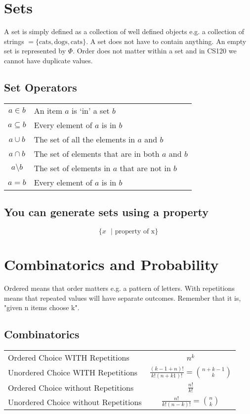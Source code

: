 \documentclass[12pt] {article}
\begin{document}
\section*{Sets}
A set is simply defined as a collection of well defined objects e.g. a collection of strings
$= \{\text{cats}, \text{dogs}, \text{cats}\}$. A set does not have to contain anything. An 
empty set is represented by $\Phi$. Order does not matter within a set and in CS120 we cannot have duplicate values.

\subsection*{Set Operators}
\begin{tabular}{c|l}
  $a \in b $ & An item $a$ is `in' a set $b$ \\
  $a \subseteq b $ & Every element of $a$ is in $b$ \\
  $a \cup b$ & The set of all the elements in $a$ and $b$ \\
  $a \cap b$ & The set of elements that are in both $a$ and $b$ \\
  $a \setminus b$ & The set of elements in $a$ that are not in $b$ \\
  $a = b$ & Every element of $a$ is in $b$ \\
\end{tabular}

\subsection*{You can generate sets using a property}
\begin{equation*}
  \{x \text{ }| \text{ property of x}\}
\end{equation*}

\section*{Combinatorics and Probability}
Ordered means that order matters e.g. a pattern of letters. With repetitions means that repeated values will have 
separate outcomes. Remember that it is, "given n items choose k".
\subsection*{Combinatorics}
\begin{tabular} {l|c}
Ordered Choice WITH Repetitions & $n^k$ \\
Unordered Choice WITH Repetitions & $\frac{(k-1+n)!}{k!(n+k1)!} = {n + k -1 \choose k}$ \\
Ordered Choice without Repetitions & $\frac{n!}{k!}$ \\
Unordered Choice without Repetitions & $\frac{n!}{k!(n-k)!} = {n \choose k}$
\end{tabular}
\end{document}

